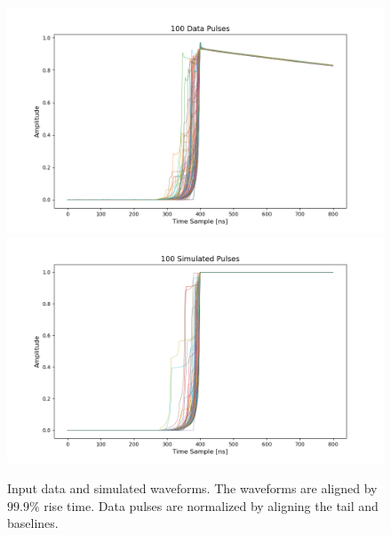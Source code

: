\begin{figure}%
    \centering
    \includegraphics[width=0.9\linewidth,trim={4pc 0cm 6pc 1cm},clip]{ch7/figs/all_data_pulses.png}
    \includegraphics[width=0.9\linewidth,trim={4pc 0cm 6pc 1cm},clip]{ch7/figs/all_simulated_pulses.png}
    \caption{Input data and simulated waveforms. The waveforms are aligned by $99.9\%$ rise time. Data pulses are normalized by aligning the tail and baselines.}
   \label{ch7_figs_in_out}
\end{figure}

